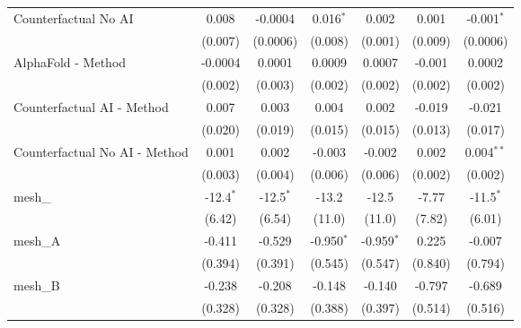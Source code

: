 \begin{tabular}{lcccccc}
   Counterfactual No AI                                        & 0.008         & -0.0004       & 0.016$^{*}$   & 0.002         & 0.001        & -0.001$^{*}$\\   
                                                               & (0.007)       & (0.0006)      & (0.008)       & (0.001)       & (0.009)      & (0.0006)\\   
   AlphaFold - Method                                          & -0.0004       & 0.0001        & 0.0009        & 0.0007        & -0.001       & 0.0002\\   
                                                               & (0.002)       & (0.003)       & (0.002)       & (0.002)       & (0.002)      & (0.002)\\   
   Counterfactual AI - Method                                  & 0.007         & 0.003         & 0.004         & 0.002         & -0.019       & -0.021\\   
                                                               & (0.020)       & (0.019)       & (0.015)       & (0.015)       & (0.013)      & (0.017)\\   
   Counterfactual No AI - Method                               & 0.001         & 0.002         & -0.003        & -0.002        & 0.002        & 0.004$^{**}$\\   
                                                               & (0.003)       & (0.004)       & (0.006)       & (0.006)       & (0.002)      & (0.002)\\   
   mesh\_                                                      & -12.4$^{*}$   & -12.5$^{*}$   & -13.2         & -12.5         & -7.77        & -11.5$^{*}$\\   
                                                               & (6.42)        & (6.54)        & (11.0)        & (11.0)        & (7.82)       & (6.01)\\   
   mesh\_A                                                     & -0.411        & -0.529        & -0.950$^{*}$  & -0.959$^{*}$  & 0.225        & -0.007\\   
                                                               & (0.394)       & (0.391)       & (0.545)       & (0.547)       & (0.840)      & (0.794)\\   
   mesh\_B                                                     & -0.238        & -0.208        & -0.148        & -0.140        & -0.797       & -0.689\\   
                                                               & (0.328)       & (0.328)       & (0.388)       & (0.397)       & (0.514)      & (0.516)\\   

\end{tabular}
